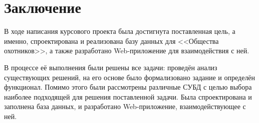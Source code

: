 \section{Заключение}
В ходе написания курсового проекта была достигнута поставленная цель, а именно, спроектирована и реализована базу данных для <<Общества охотников>>, а также разработано Web-приложение для взаимодействия с ней.

В процессе её выполнения были решены все задачи: проведён анализ существующих решений, на его основе было формализовано задание и определён функционал. Помимо этого были рассмотрены различные СУБД с целью выбора наиболее подходящей для решения поставленной задачи. Была спроектирована и заполнена база данных, и разработано Web-приложение, взаимодействующее с ней.


